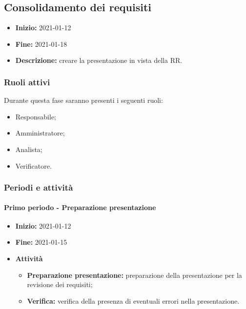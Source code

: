 
\subsection{Consolidamento dei requisiti} \label{_pianificazioneConsolidamentoDeiRequisiti}
\begin{itemize}
    \item []\textbf{Inizio:} 2021-01-12
    \item []\textbf{Fine:} 2021-01-18
    \item []\textbf{Descrizione:} creare la presentazione in vista della RR.
\end{itemize}

\subsubsection{Ruoli attivi}
Durante questa fase saranno presenti i seguenti ruoli:
\begin{itemize}
    \item Responsabile;
    \item Amministratore;
    \item Analista;
    \item Verificatore.
\end{itemize}

\subsubsection{Periodi e attività}

\paragraph[Primo periodo]{Primo periodo - \textnormal{Preparazione presentazione}}
\begin{itemize}
    \item [] \textbf{Inizio:} 2021-01-12
    \item [] \textbf{Fine:} 2021-01-15
    \item [] \textbf{Attività}
          \begin{itemize}
              \item \textbf{Preparazione presentazione:} preparazione della presentazione per la revisione dei requisiti;
              \item \textbf{Verifica:} verifica della presenza di eventuali errori nella presentazione.
          \end{itemize}
\end{itemize}

